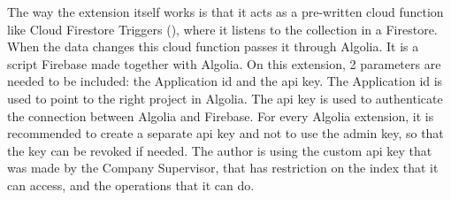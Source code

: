 The way the extension itself works is that it acts as a pre-written cloud function like Cloud Firestore Triggers (\textit{\cite{cloudTriggers}}),
where it listens to the collection in a Firestore. When the data changes this cloud function passes it through Algolia. It is a script Firebase made
together with Algolia. On this extension, 2 parameters are needed to be included: the Application \acrshort{id} and the \acrshort{api} key. The Application
\acrshort{id} is used to point to the right project in Algolia. The \acrshort{api} key is used to authenticate the connection between Algolia and Firebase.
For every Algolia extension, it is recommended to create a separate \acrshort{api} key and not to use the admin key, so that the key can be revoked if needed.
The author is using the custom \acrshort{api} key that was made by the Company Supervisor, that has restriction on the index that it can access, and the
operations that it can do.






